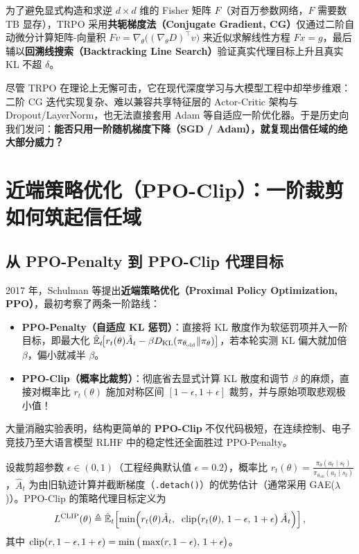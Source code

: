 为了避免显式构造和求逆 $d \times d$ 维的 Fisher 矩阵 $F$（对百万参数网络，$F$ 需要数 TB 显存），TRPO 采用\textbf{共轭梯度法（Conjugate Gradient, CG）}仅通过二阶自动微分计算矩阵-向量积 $Fv = \nabla_\theta\big((\nabla_\theta D)^\top v\big)$ 来近似求解线性方程 $Fx = g$，最后辅以\textbf{回溯线搜索（Backtracking Line Search）}验证真实代理目标上升且真实 KL 不超 $\delta$。

尽管 TRPO 在理论上无懈可击，它在现代深度学习与大模型工程中却举步维艰：二阶 CG 迭代实现复杂、难以兼容共享特征层的 Actor-Critic 架构与 Dropout/LayerNorm，也无法直接套用 Adam 等自适应一阶优化器。于是历史向我们发问：\textbf{能否只用一阶随机梯度下降（SGD / Adam），就复现出信任域的绝大部分威力？}

\section{近端策略优化（PPO-Clip）：一阶裁剪如何筑起信任域}
\label{sec:ppo-clip}

\subsection{从 PPO-Penalty 到 PPO-Clip 代理目标}

2017 年，Schulman 等提出\textbf{近端策略优化（Proximal Policy Optimization, PPO）}，最初考察了两条一阶路线：
\begin{itemize}
  \item \textbf{PPO-Penalty（自适应 KL 惩罚）}：直接将 KL 散度作为软惩罚项并入一阶目标，即最大化 $\hat{\mathbb{E}}_t\!\big[r_t(\theta)\hat{A}_t - \beta D_{\mathrm{KL}}(\pi_{\theta_{\mathrm{old}}} \| \pi_\theta)\big]$，若本轮实测 KL 偏大就加倍 $\beta$，偏小就减半 $\beta$。
  \item \textbf{PPO-Clip（概率比裁剪）}：彻底省去显式计算 KL 散度和调节 $\beta$ 的麻烦，直接对概率比 $r_t(\theta)$ 施加对称区间 $[1-\epsilon, 1+\epsilon]$ 裁剪，并与原始项取悲观极小值！
\end{itemize}
大量消融实验表明，结构更简单的 \textbf{PPO-Clip} 不仅代码极短，在连续控制、电子竞技乃至大语言模型 RLHF 中的稳定性还全面胜过 PPO-Penalty。

\begin{defBox}
\begin{definition}
\label{def:ppo-clip}
设裁剪超参数 $\epsilon \in (0, 1)$（工程经典默认值 $\epsilon = 0.2$），概率比 $r_t(\theta) = \frac{\pi_\theta(a_t \mid s_t)}{\pi_{\theta_{\mathrm{old}}}(a_t \mid s_t)}$，$\hat{A}_t$ 为由旧轨迹计算并截断梯度（\texttt{.detach()}）的优势估计（通常采用 GAE($\lambda$)）。PPO-Clip 的策略代理目标定义为
\begin{equation}
  L^{\mathrm{CLIP}}(\theta)
  \triangleq \hat{\mathbb{E}}_t\!\left[\min\!\Big(r_t(\theta)\hat{A}_t,\;\; \operatorname{clip}\!\big(r_t(\theta),\, 1-\epsilon,\, 1+\epsilon\big)\,\hat{A}_t\Big)\right],
  \label{eq:ppo-clip}
\end{equation}
其中 $\operatorname{clip}(r, 1-\epsilon, 1+\epsilon) = \min\big(\max(r, 1-\epsilon),\, 1+\epsilon\big)$。
\end{definition}
\end{defBox}

